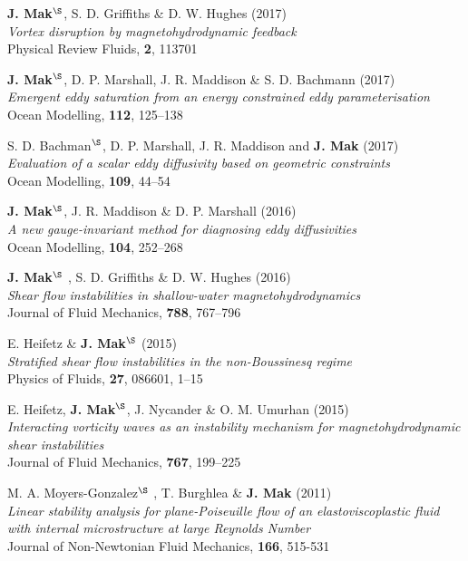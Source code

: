 \documentclass[letterpaper]{article}
\renewenvironment{itemize}{
  \begin{list}{}{
    \setlength{\leftmargin}{1.5em}
  }
}{
  \end{list}
}
\begin{document}
\begin{itemize}
\item[8.] \textbf{J. Mak}$^{\S}$, S. D. Griffiths \& D. W. Hughes
(2017)\\
\textit{Vortex disruption by magnetohydrodynamic feedback}\\
Physical Review Fluids, \textbf{2}, 113701

\item[7.] \textbf{J. Mak}$^{\S}$, D. P. Marshall, J. R. Maddison \& S. D. Bachmann
(2017)\\
\textit{Emergent eddy saturation from an energy constrained eddy parameterisation}\\
Ocean Modelling, \textbf{112}, 125--138

\item[6.] S. D. Bachman$^{\S}$, D. P. Marshall, J. R. Maddison and \textbf{J. Mak}
(2017)\\
\textit{Evaluation of a scalar eddy diffusivity based on geometric constraints}\\
Ocean Modelling, \textbf{109}, 44--54

\item[5.] \textbf{J. Mak}$^{\S}$, J. R. Maddison \& D. P. Marshall
(2016)\\
\textit{A new gauge-invariant method for diagnosing eddy diffusivities}\\
Ocean Modelling, \textbf{104}, 252--268

\item[4.] \textbf{J. Mak}$^{\S}$ , S. D. Griffiths \& D. W. Hughes
(2016)\\
\textit{Shear flow instabilities in shallow-water magnetohydrodynamics}\\
Journal of Fluid Mechanics, \textbf{788}, 767--796

\item[3.] E. Heifetz \& \textbf{J. Mak}$^{\S}$ (2015)\\
\textit{Stratified shear flow instabilities in the non-Boussinesq regime}\\
Physics of Fluids, \textbf{27}, 086601, 1--15

\item[2.] E. Heifetz, \textbf{J. Mak}$^{\S}$, J. Nycander \& O. M.
Umurhan (2015)\\
\textit{Interacting vorticity waves as an instability mechanism for
magnetohydrodynamic shear instabilities}\\
Journal of Fluid Mechanics, \textbf{767}, 199--225

\item[1.] M. A. Moyers-Gonzalez$^{\S}$ , T. Burghlea \& \textbf{J. Mak}
(2011)\\
\textit{Linear stability analysis for plane-Poiseuille flow of an
elastoviscoplastic fluid with internal microstructure at large Reynolds
Number}\\
Journal of Non-Newtonian Fluid Mechanics, \textbf{166}, 515-531
\end{itemize}
\end{document}
